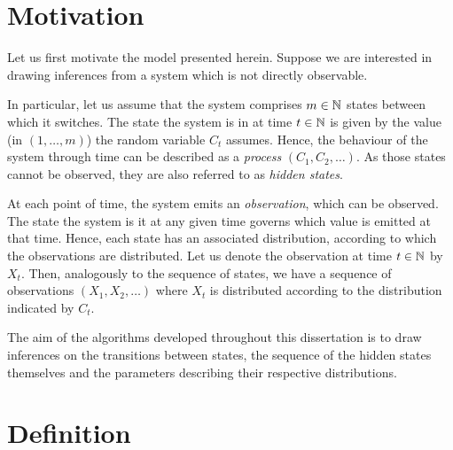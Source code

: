 \section{Motivation}

Let us first motivate the model presented herein. Suppose we are interested in drawing inferences from a system which is not directly observable. 

In particular, let us assume that the system comprises $m \in \mathbb{N}$ states between which it switches. The state the system is in at time $t \in \mathbb{N}$ is given by the value (in $\left(1, \dots, m\right)$) the random variable $C_t$ assumes. Hence, the behaviour of the system through time can be described as a \textit{process} $\left(C_1, C_2, \dots \right)$. As those states cannot be observed, they are also referred to as \textit{hidden states}. 

At each point of time, the system emits an \textit{observation}, which can be observed. The state the system is it at any given time governs which value is emitted at that time. Hence, each state has an associated distribution, according to which the observations are distributed. Let us denote the observation at time $t \in \mathbb{N}$ by $X_t$. Then, analogously to the sequence of states, we have a sequence of observations $\left(X_1, X_2, \dots \right)$ where $X_t$ is distributed according to the distribution indicated by $C_t$. 

The aim of the algorithms developed throughout this dissertation is to draw inferences on the transitions between states, the sequence of the hidden states themselves  and the parameters describing their respective distributions. 






\section{Definition}


